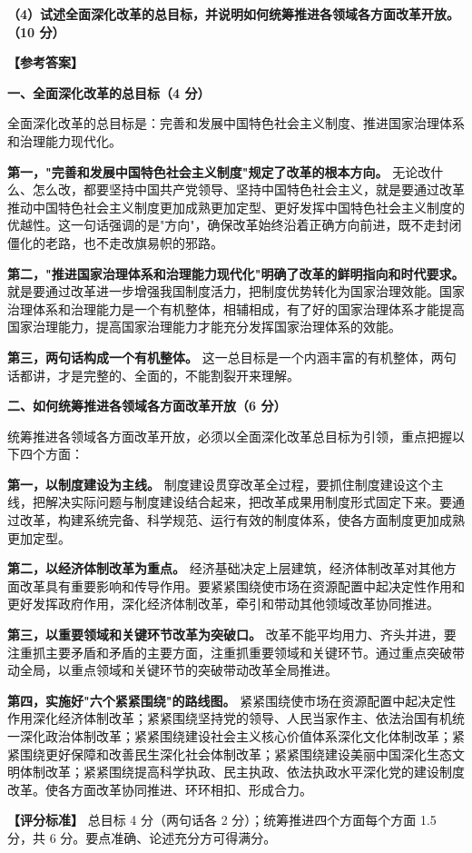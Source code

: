 \documentclass[12pt, a4paper]{article}
\begin{document}
\begin{answerbox}
\textbf{（4）试述全面深化改革的总目标，并说明如何统筹推进各领域各方面改革开放。（10 分）}

\textbf{【参考答案】}

\textbf{一、全面深化改革的总目标（4 分）}

全面深化改革的总目标是：完善和发展中国特色社会主义制度、推进国家治理体系和治理能力现代化。

\textbf{第一，"完善和发展中国特色社会主义制度"规定了改革的根本方向。} 无论改什么、怎么改，都要坚持中国共产党领导、坚持中国特色社会主义，就是要通过改革推动中国特色社会主义制度更加成熟更加定型、更好发挥中国特色社会主义制度的优越性。这一句话强调的是"方向"，确保改革始终沿着正确方向前进，既不走封闭僵化的老路，也不走改旗易帜的邪路。

\textbf{第二，"推进国家治理体系和治理能力现代化"明确了改革的鲜明指向和时代要求。} 就是要通过改革进一步增强我国制度活力，把制度优势转化为国家治理效能。国家治理体系和治理能力是一个有机整体，相辅相成，有了好的国家治理体系才能提高国家治理能力，提高国家治理能力才能充分发挥国家治理体系的效能。

\textbf{第三，两句话构成一个有机整体。} 这一总目标是一个内涵丰富的有机整体，两句话都讲，才是完整的、全面的，不能割裂开来理解。

\textbf{二、如何统筹推进各领域各方面改革开放（6 分）}

统筹推进各领域各方面改革开放，必须以全面深化改革总目标为引领，重点把握以下四个方面：

\textbf{第一，以制度建设为主线。} 制度建设贯穿改革全过程，要抓住制度建设这个主线，把解决实际问题与制度建设结合起来，把改革成果用制度形式固定下来。要通过改革，构建系统完备、科学规范、运行有效的制度体系，使各方面制度更加成熟更加定型。

\textbf{第二，以经济体制改革为重点。} 经济基础决定上层建筑，经济体制改革对其他方面改革具有重要影响和传导作用。要紧紧围绕使市场在资源配置中起决定性作用和更好发挥政府作用，深化经济体制改革，牵引和带动其他领域改革协同推进。

\textbf{第三，以重要领域和关键环节改革为突破口。} 改革不能平均用力、齐头并进，要注重抓主要矛盾和矛盾的主要方面，注重抓重要领域和关键环节。通过重点突破带动全局，以重点领域和关键环节的突破带动改革全局推进。

\textbf{第四，实施好"六个紧紧围绕"的路线图。} 紧紧围绕使市场在资源配置中起决定性作用深化经济体制改革；紧紧围绕坚持党的领导、人民当家作主、依法治国有机统一深化政治体制改革；紧紧围绕建设社会主义核心价值体系深化文化体制改革；紧紧围绕更好保障和改善民生深化社会体制改革；紧紧围绕建设美丽中国深化生态文明体制改革；紧紧围绕提高科学执政、民主执政、依法执政水平深化党的建设制度改革。使各方面改革协同推进、环环相扣、形成合力。

\textbf{【评分标准】} 总目标 4 分（两句话各 2 分）；统筹推进四个方面每个方面 1.5 分，共 6 分。要点准确、论述充分方可得满分。
\end{answerbox}
\end{document}
